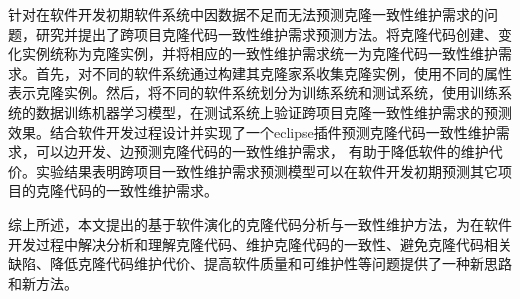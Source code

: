 {针对在软件开发初期软件系统中因数据不足而无法预测克隆一致性维护需求的问题，研究并提出了跨项目克隆代码一致性维护需求预测方法。将克隆代码创建、变化实例统称为克隆实例，并将相应的一致性维护需求统一为克隆代码一致性维护需求。首先，对不同的软件系统通过构建其克隆家系收集克隆实例，使用不同的属性表示克隆实例。然后，将不同的软件系统划分为训练系统和测试系统，使用训练系统的数据训练机器学习模型，在测试系统上验证跨项目克隆一致性维护需求的预测效果。结合软件开发过程设计并实现了一个eclipse插件预测克隆代码一致性维护需求，可以边开发、边预测克隆代码的一致性维护需求， 有助于降低软件的维护代价。实验结果表明跨项目一致性维护需求预测模型可以在软件开发初期预测其它项目的克隆代码的一致性维护需求。

综上所述，本文提出的基于软件演化的克隆代码分析与一致性维护方法，为在软件开发过程中解决分析和理解克隆代码、维护克隆代码的一致性、避免克隆代码相关缺陷、降低克隆代码维护代价、提高软件质量和可维护性等问题提供了一种新思路和新方法。
}


